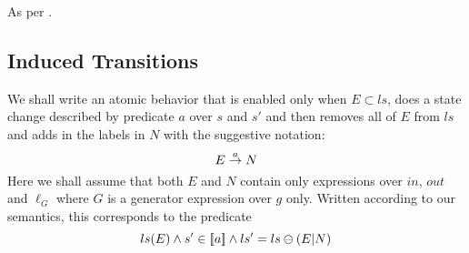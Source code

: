 As per \cite{conf/popl/Dinsdale-YoungBGPY13}.

\subsection{Induced Transitions}

We shall write an atomic behavior
that is enabled only when $E \subset ls$,
does a state change described by predicate $a$ over $s$ and $s'$
and then removes all of $E$ from $ls$ and adds in the labels in $N$
with the suggestive notation:
\[
 E \stackrel{a}{\rightarrow} N
\]
Here we shall assume that both $E$ and $N$
contain only expressions over $in$, $out$ and $\ell_G$
where $G$ is a generator expression over $g$ only.
Written according to our semantics,
this corresponds to the predicate
\[
  ls(E) \land s' \in [\![{a}]\!] \land ls'=ls\ominus(E|N)
\]

